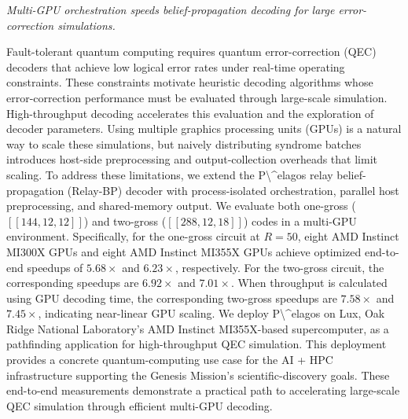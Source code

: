 \documentclass[12pt,letterpaper]{article}
\begin{document}
{\footnotesize\textit{Multi-GPU orchestration speeds belief-propagation decoding for large error-correction simulations.}\par}\nopagebreak
{\footnotesize Fault-tolerant quantum computing requires quantum error-correction (QEC) decoders that achieve low logical error rates under real-time operating constraints. These constraints motivate heuristic decoding algorithms whose error-correction performance must be evaluated through large-scale simulation. High-throughput decoding accelerates this evaluation and the exploration of decoder parameters. Using multiple graphics processing units (GPUs) is a natural way to scale these simulations, but naively distributing syndrome batches introduces host-side preprocessing and output-collection overheads that limit scaling. To address these limitations, we extend the P\textbackslash{}\textasciicircum{}elagos relay belief-propagation (Relay-BP) decoder with process-isolated orchestration, parallel host preprocessing, and shared-memory output. We evaluate both one-gross ($[[144,12,12]]$) and two-gross ($[[288,12,18]]$) codes in a multi-GPU environment. Specifically, for the one-gross circuit at $R=50$, eight AMD Instinct MI300X GPUs and eight AMD Instinct MI355X GPUs achieve optimized end-to-end speedups of $5.68\times$ and $6.23\times$, respectively. For the two-gross circuit, the corresponding speedups are $6.92\times$ and $7.01\times$. When throughput is calculated using GPU decoding time, the corresponding two-gross speedups are $7.58\times$ and $7.45\times$, indicating near-linear GPU scaling. We deploy P\textbackslash{}\textasciicircum{}elagos on Lux, Oak Ridge National Laboratory's AMD Instinct MI355X-based supercomputer, as a pathfinding application for high-throughput QEC simulation. This deployment provides a concrete quantum-computing use case for the AI + HPC infrastructure supporting the Genesis Mission's scientific-discovery goals. These end-to-end measurements demonstrate a practical path to accelerating large-scale QEC simulation through efficient multi-GPU decoding.\par}
\medskip
\end{document}
